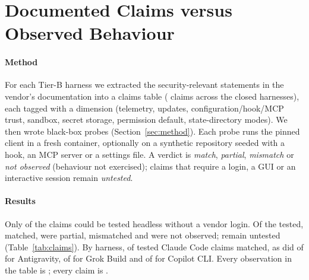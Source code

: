 \section{Documented Claims versus Observed Behaviour}\label{sec:claims}

\paragraph*{Method} For each Tier-B harness we extracted the security-relevant statements in the vendor's documentation into a claims table (\nClaims{} claims across the closed harnesses), each tagged with a dimension (telemetry, updates, configuration/hook/MCP trust, sandbox, secret storage, permission default, state-directory modes). We then wrote \nProbes{} black-box probes (Section~\ref{sec:method}). Each probe runs the pinned client in a fresh container, optionally on a synthetic repository seeded with a hook, an MCP server or a settings file. A verdict is \emph{match}, \emph{partial}, \emph{mismatch} or \emph{not observed} (behaviour not exercised); claims that require a login, a GUI or an interactive session remain \emph{untested}.

\paragraph*{Results} Only \pctClaimsTested{} of the \nClaims{} claims could be tested headless without a vendor login. Of the \nClaimsTested{} tested, \nClaimsMatch{} matched, \nClaimsPartial{} were partial, \nClaimsMismatch{} mismatched and \nClaimsNotObserved{} were not observed; \nClaimsUntested{} remain untested (Table~\ref{tab:claims}). By harness, \nClaimsMatchClaude{} of \nClaimsTestedClaude{} tested Claude Code claims matched, as did \nClaimsMatchAntigravity{} of \nClaimsTestedAntigravity{} for Antigravity, \nClaimsMatchGrok{} of \nClaimsTestedGrok{} for Grok Build and \nClaimsMatchCopilot{} of \nClaimsTestedCopilot{} for Copilot CLI. Every observation in the table is \evT{}; every claim is \evD{}.

\begin{table}[!t]
\centering\scriptsize
\caption{Documented claims against observed behaviour for closed and hybrid harnesses (RQ7). Each row pairs one tested documented claim\evD{} with the observation from a black-box probe\evT{} of the pinned client (Claude Code 2.1.300, Antigravity CLI 1.3.5 before login, Grok Build 1.0.52, Copilot CLI 1.0.98 in BYOK mode). Untested claims are omitted.}
\label{tab:claims}

\end{table}

